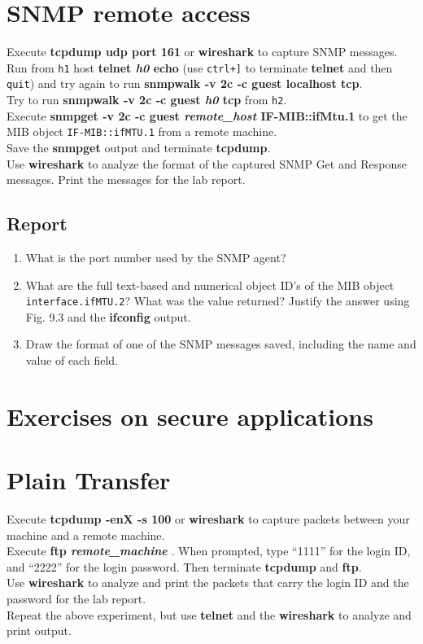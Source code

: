 \documentclass[10pt,a4paper]{article}
\numberwithin{equation}{section}
\numberwithin{figure}{section}
\numberwithin{table}{section}
\begin{document}
\section{SNMP remote access}
	Execute \textbf{tcpdump udp port 161} or \textbf{wireshark} to capture SNMP messages.\\
	Run from \texttt{h1} host \textbf{telnet \textit{h0} echo} (use \texttt{ctrl+]} to terminate \textbf{telnet} and then \texttt{quit}) and try again to run \textbf{snmpwalk -v 2c -c guest localhost tcp}.\\
	Try to run \textbf{snmpwalk -v 2c -c guest \textit{h0} tcp} from \texttt{h2}.\\
	Execute \textbf{snmpget -v 2c -c guest \textit{remote\_host} IF-MIB::ifMtu.1} to get the MIB object \texttt{IF-MIB::ifMTU.1} from a remote machine.\\
	Save the \textbf{snmpget} output and terminate \textbf{tcpdump}.\\
	Use \textbf{wireshark} to analyze the format of the captured SNMP Get and Response messages. Print the messages for the lab report.
	
	\subsection*{Report}
	\begin{enumerate}
		\item What is the port number used by the SNMP agent?
		\item What are the full text-based and numerical object ID’s of the MIB object \texttt{interface.ifMTU.2}? What was the value returned? Justify the answer using Fig. 9.3 and the \textbf{ifconfig} output.
		\item Draw the format of one of the SNMP messages saved, including the name and value of each field.
	\end{enumerate}

\section*{Exercises on secure applications}
	
\section{Plain Transfer}
	Execute \textbf{tcpdump -enX -s 100} or \textbf{wireshark} to capture packets between your machine and a remote machine.\\
	Execute \textbf{ftp \textit{remote\_machine}} . When prompted, type “1111” for the login ID, and “2222” for the login password. Then terminate \textbf{tcpdump} and \textbf{ftp}.\\
	Use \textbf{wireshark} to analyze and print the packets that carry the login ID and the password for the lab report.\\
	Repeat the above experiment, but use \textbf{telnet} and the \textbf{wireshark} to analyze and print output.
\end{document}
